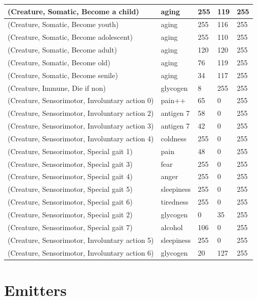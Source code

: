 \documentclass{article}
\begin{document}
\begin{longtable}{|p{7cm}|p{3cm}|p{2cm}|p{2cm}|p{2cm}|}
(Creature, Somatic, Become a child) & aging & 255 & 119 & 255 \\ \hline
(Creature, Somatic, Become youth) & aging & 255 & 116 & 255 \\ \hline
(Creature, Somatic, Become adolescent) & aging & 255 & 110 & 255 \\ \hline
(Creature, Somatic, Become adult) & aging & 120 & 120 & 255 \\ \hline
(Creature, Somatic, Become old) & aging & 76 & 119 & 255 \\ \hline
(Creature, Somatic, Become senile) & aging & 34 & 117 & 255 \\ \hline
(Creature, Immune, Die if non) & glycogen & 8 & 255 & 255 \\ \hline
(Creature, Sensorimotor, Involuntary action 0) & pain++ & 65 & 0 & 255 \\ \hline
(Creature, Sensorimotor, Involuntary action 2) & antigen 7 & 58 & 0 & 255 \\ \hline
(Creature, Sensorimotor, Involuntary action 3) & antigen 7 & 42 & 0 & 255 \\ \hline
(Creature, Sensorimotor, Involuntary action 4) & coldness & 255 & 0 & 255 \\ \hline
(Creature, Sensorimotor, Special gait 1) & pain & 48 & 0 & 255 \\ \hline
(Creature, Sensorimotor, Special gait 3) & fear & 255 & 0 & 255 \\ \hline
(Creature, Sensorimotor, Special gait 4) & anger & 255 & 0 & 255 \\ \hline
(Creature, Sensorimotor, Special gait 5) & sleepiness & 255 & 0 & 255 \\ \hline
(Creature, Sensorimotor, Special gait 6) & tiredness & 255 & 0 & 255 \\ \hline
(Creature, Sensorimotor, Special gait 2) & glycogen & 0 & 35 & 255 \\ \hline
(Creature, Sensorimotor, Special gait 7) & alcohol & 106 & 0 & 255 \\ \hline
(Creature, Sensorimotor, Involuntary action 5) & sleepiness & 255 & 0 & 255 \\ \hline
(Creature, Sensorimotor, Involuntary action 6) & glycogen & 20 & 127 & 255 \\ \hline
\end{longtable}

\newpage

\section*{Emitters}
\end{document}
